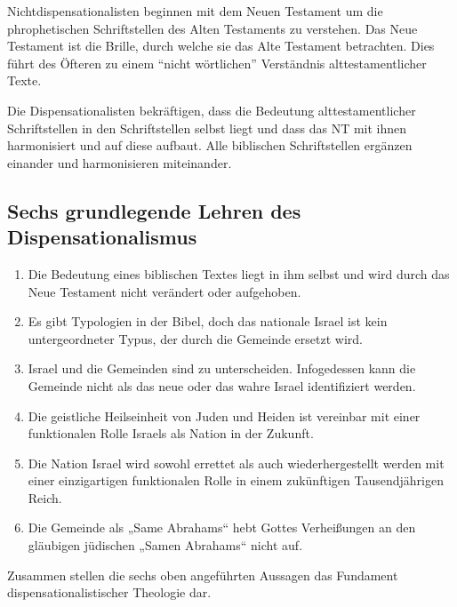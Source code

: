 \documentclass{mybib}
\begin{document}
Nichtdispensationalisten beginnen mit dem Neuen Testament um die phrophetischen Schriftstellen des Alten Testaments zu verstehen. Das Neue Testament ist die Brille, durch welche sie das Alte Testament betrachten. Dies führt des Öfteren zu einem \enquote{nicht wörtlichen} Verständnis alttestamentlicher Texte.

Die Dispensationalisten bekräftigen, dass die Bedeutung alttestamentlicher Schriftstellen in den Schriftstellen selbst liegt und dass das NT mit ihnen harmonisiert und auf diese aufbaut. Alle biblischen Schriftstellen ergänzen einander und harmonisieren miteinander.

\subsection{Sechs grundlegende Lehren des Dispensationalismus}
\begin{enumerate}
    \item Die Bedeutung eines biblischen Textes liegt in ihm selbst und wird durch das Neue Testament nicht verändert oder aufgehoben.
    \item Es gibt Typologien in der Bibel, doch das nationale Israel ist kein untergeordneter Typus, der
durch die Gemeinde ersetzt wird.
    \item Israel und die Gemeinden sind zu unterscheiden. Infogedessen kann die Gemeinde nicht als das neue oder das wahre Israel identifiziert werden.
    \item Die geistliche Heilseinheit von Juden und Heiden ist vereinbar mit einer funktionalen Rolle Israels als Nation in der Zukunft.
    \item Die Nation Israel wird sowohl errettet als auch wiederhergestellt werden mit einer einzigartigen funktionalen Rolle in einem zukünftigen Tausendjährigen Reich.
    \item Die Gemeinde als „Same Abrahams“ hebt Gottes Verheißungen an den gläubigen jüdischen „Samen Abrahams“ nicht auf.
\end{enumerate}
Zusammen stellen die sechs oben angeführten Aussagen das Fundament dispensationalistischer Theologie dar.
    
\end{document}
